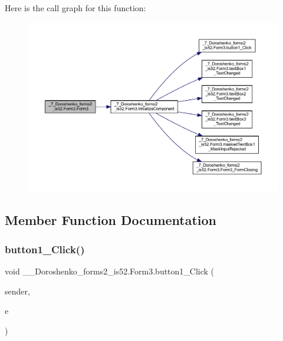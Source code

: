 Here is the call graph for this function\+:
\nopagebreak
\begin{figure}[H]
\begin{center}
\leavevmode
\includegraphics[width=350pt]{class__7___doroshenko__forms2__is52_1_1_form3_a21f3d82d83cd30ee58daa82b090e93d5_cgraph}
\end{center}
\end{figure}


\subsection{Member Function Documentation}
\hypertarget{class__7___doroshenko__forms2__is52_1_1_form3_a77c7b13a40218b6c1b9401bb82187636}{}\label{class__7___doroshenko__forms2__is52_1_1_form3_a77c7b13a40218b6c1b9401bb82187636} 
\subsubsection{\texorpdfstring{button1\+\_\+\+Click()}{button1\_Click()}}
{\footnotesize\ttfamily void \+\_\+\_\+\+Doroshenko\+\_\+forms2\+\_\+is52.\+Form3.\+button1\+\_\+\+Click (\begin{DoxyParamCaption}\item[{object}]{sender,  }\item[{Event\+Args}]{e }\end{DoxyParamCaption})\hspace{0.3cm}{\ttfamily [private]}}

